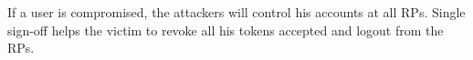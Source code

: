 If a user is compromised,
    the attackers will control his accounts at all RPs.
Single sign-off \cite{GhasemisharifRC18} helps the victim
 to revoke all his tokens accepted and logout from the RPs.




